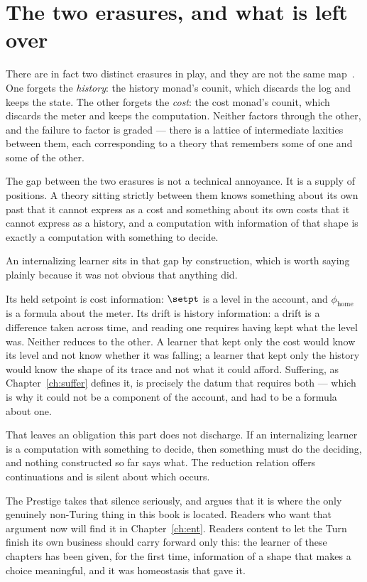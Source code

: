 \section{The two erasures, and what is left over}

\begin{remark}
\label{rmk:two-erasures}
There are in fact two distinct erasures in play, and they are not the
same map~\cite{TwoErasures}.
One forgets the \emph{history}: the history monad's counit, which
discards the log and keeps the state.
The other forgets the \emph{cost}: the cost monad's counit, which
discards the meter and keeps the computation.
Neither factors through the other, and the failure to factor is graded
--- there is a lattice of intermediate laxities between them, each
corresponding to a theory that remembers some of one and some of the
other.

The gap between the two erasures is not a technical annoyance.
It is a supply of positions.
A theory sitting strictly between them knows something about its own past
that it cannot express as a cost and something about its own costs that
it cannot express as a history, and a computation with information of
that shape is exactly a computation with something to decide.
\end{remark}

An internalizing learner sits in that gap by construction, which is worth
saying plainly because it was not obvious that anything did.

Its held setpoint is cost information: $\setpt$ is a level in the
account, and $\phi_{\mathrm{home}}$ is a formula about the meter.
Its drift is history information: a drift is a difference taken across
time, and reading one requires having kept what the level was.
Neither reduces to the other.
A learner that kept only the cost would know its level and not know
whether it was falling; a learner that kept only the history would know
the shape of its trace and not what it could afford.
Suffering, as Chapter~\ref{ch:suffer} defines it, is precisely the datum
that requires both --- which is why it could not be a component of the
account, and had to be a formula about one.

\begin{remark}
\label{ent:rmk:handoff}
That leaves an obligation this part does not discharge.
If an internalizing learner is a computation with something to decide,
then something must do the deciding, and nothing constructed so far says
what.
The reduction relation offers continuations and is silent about which
occurs.

The Prestige takes that silence seriously, and argues that it is where
the only genuinely non-Turing thing in this book is located.
Readers who want that argument now will find it in
Chapter~\ref{ch:ent}.
Readers content to let the Turn finish its own business should carry
forward only this: the learner of these chapters has been given, for the
first time, information of a shape that makes a choice meaningful, and it
was homeostasis that gave it.
\end{remark}

